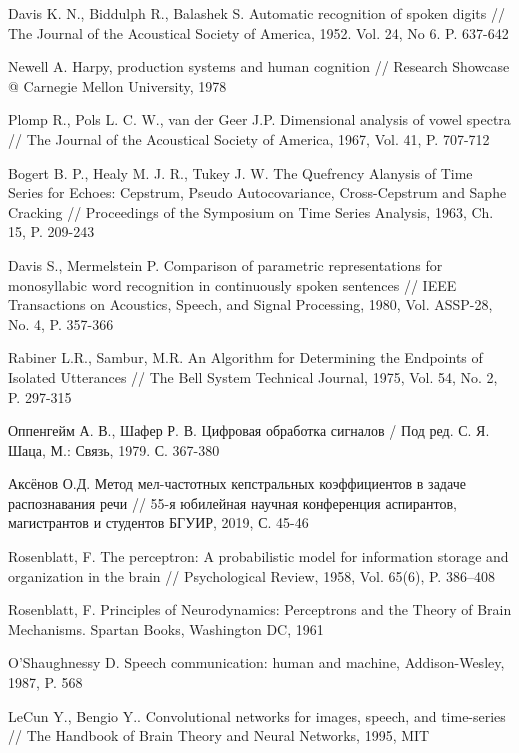 \begin{thebibliography}{1}
Davis K. N., Biddulph R., Balashek S. Automatic recognition of spoken digits // The Journal of the Acoustical Society of America, 1952. Vol. 24, No 6. P. 637-642 

Newell A. Harpy, production systems and human cognition // Research Showcase @ Carnegie Mellon University, 1978

Plomp R., Pols L. C. W., van der Geer J.P. Dimensional analysis of vowel spectra // The Journal of the Acoustical Society of America, 1967, Vol. 41, P. 707-712 

Bogert B. P., Healy M. J. R., Tukey J. W. The Quefrency Alanysis of Time Series for Echoes: Cepstrum, Pseudo Autocovariance, Cross-Cepstrum and Saphe Cracking // Proceedings of the Symposium on Time Series Analysis, 1963, Ch. 15, P. 209-243

Davis S., Mermelstein P. Comparison of parametric representations for monosyllabic word recognition in continuously spoken sentences // IEEE Transactions on Acoustics, Speech, and Signal Processing, 1980, Vol. ASSP-28, No. 4, P. 357-366

Rabiner L.R., Sambur, M.R. An Algorithm for Determining the Endpoints of Isolated Utterances // The Bell System Technical Journal, 1975, Vol. 54, No. 2, P. 297-315

Оппенгейм А. В., Шафер Р. В. Цифровая обработка сигналов / Под ред. С. Я. Шаца, М.: Связь, 1979. С. 367-380

Аксёнов О.Д. Метод мел-частотных кепстральных коэффициентов в задаче распознавания речи // 55-я юбилейная научная конференция аспирантов, магистрантов и студентов БГУИР, 2019, С. 45-46

Rosenblatt, F. The perceptron: A probabilistic model for information storage and organization in the brain // Psychological Review, 1958, Vol. 65(6), P. 386–408

Rosenblatt, F. Principles of Neurodynamics: Perceptrons and the Theory of Brain Mechanisms. Spartan Books, Washington DC, 1961

O'Shaughnessy D. Speech communication: human and machine, Addison-Wesley, 1987, P. 568

LeCun Y., Bengio Y.. Convolutional networks for images, speech, and time-series // The Handbook of Brain Theory and Neural Networks, 1995, MIT 
\end{thebibliography}